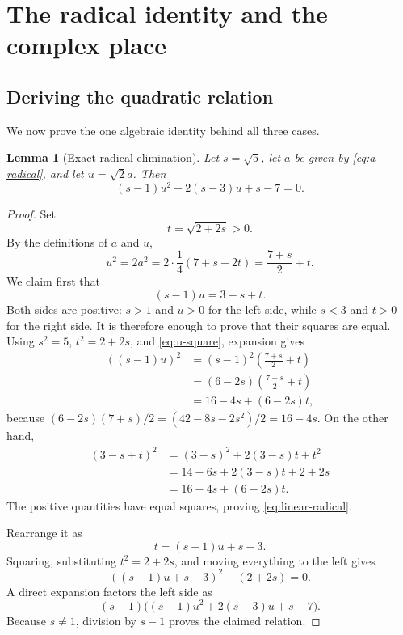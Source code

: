 \documentclass[11pt]{article}
\numberwithin{equation}{section}
\newtheorem{lemma}[theorem]{Lemma}
\theoremstyle{definition}
\theoremstyle{remark}
\begin{document}
\section{The radical identity and the complex place}
\label{sec:field-obstruction}

\subsection{Deriving the quadratic relation}

We now prove the one algebraic identity behind all three cases.

\begin{lemma}[Exact radical elimination]
\label{lem:radical-relation}
Let \(s=\sqrt5\), let \(a\) be given by \eqref{eq:a-radical}, and let
\(u=\sqrt2a\).  Then
\begin{equation}
 (s-1)u^2+2(s-3)u+s-7=0.
\label{eq:cycle-relation}
\end{equation}
\end{lemma}

\begin{proof}
Set
\[
 t=\sqrt{2+2s}>0.
\]
By the definitions of \(a\) and \(u\),
\begin{equation}
 u^2=2a^2
 =2\cdot\frac14(7+s+2t)
 =\frac{7+s}{2}+t.
\label{eq:u-square}
\end{equation}
We claim first that
\begin{equation}
 (s-1)u=3-s+t.
\label{eq:linear-radical}
\end{equation}
Both sides are positive: \(s>1\) and \(u>0\) for the left side, while
\(s<3\) and \(t>0\) for the right side.  It is therefore enough to prove
that their squares are equal.  Using \(s^2=5\), \(t^2=2+2s\), and
\eqref{eq:u-square}, expansion gives
\[
\begin{aligned}
 ((s-1)u)^2
 &=(s-1)^2\left(\frac{7+s}{2}+t\right)\\
 &=(6-2s)\left(\frac{7+s}{2}+t\right)\\
 &=16-4s+(6-2s)t,
\end{aligned}
\]
because
\((6-2s)(7+s)/2=(42-8s-2s^2)/2=16-4s\).  On the other hand,
\[
\begin{aligned}
 (3-s+t)^2
 &=(3-s)^2+2(3-s)t+t^2\\
 &=14-6s+2(3-s)t+2+2s\\
 &=16-4s+(6-2s)t.
\end{aligned}
\]
The positive quantities have equal squares, proving
\eqref{eq:linear-radical}.

Rearrange it as
\begin{equation}
 t=(s-1)u+s-3.
\label{eq:t-linear}
\end{equation}
Squaring, substituting \(t^2=2+2s\), and moving everything to the left gives
\[
 ((s-1)u+s-3)^2-(2+2s)=0.
\]
A direct expansion factors the left side as
\[
 (s-1)\bigl((s-1)u^2+2(s-3)u+s-7\bigr).
\]
Because \(s\ne1\), division by \(s-1\) proves the claimed relation.
\end{proof}
\end{document}
